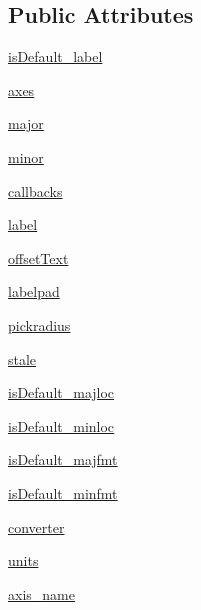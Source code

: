 \subsection*{Public Attributes}
\begin{DoxyCompactItemize}
\item 
\hyperlink{classmatplotlib_1_1axis_1_1Axis_a7c774d9fdb8d627010a5d7ff06da307b}{is\+Default\+\_\+label}
\item 
\hyperlink{classmatplotlib_1_1axis_1_1Axis_a55269c0e994e1786159877159b2a2a42}{axes}
\item 
\hyperlink{classmatplotlib_1_1axis_1_1Axis_a349fa77c014c5e44f472634075372df2}{major}
\item 
\hyperlink{classmatplotlib_1_1axis_1_1Axis_aee64f69c8c9efa6020be9cdefe5dbb49}{minor}
\item 
\hyperlink{classmatplotlib_1_1axis_1_1Axis_aa5e41db1ca96c52f36fca6e4393e3c77}{callbacks}
\item 
\hyperlink{classmatplotlib_1_1axis_1_1Axis_a2a176cae6b3bf1765db699f93604ac77}{label}
\item 
\hyperlink{classmatplotlib_1_1axis_1_1Axis_ae13c6fed1da8124b0367ddf6eca30635}{offset\+Text}
\item 
\hyperlink{classmatplotlib_1_1axis_1_1Axis_a07b62434c61bfbbba27c2b645040deae}{labelpad}
\item 
\hyperlink{classmatplotlib_1_1axis_1_1Axis_a25dc1b86cf6496a71d340ae4bb4f1c96}{pickradius}
\item 
\hyperlink{classmatplotlib_1_1axis_1_1Axis_a25818459cf429648f7c103f626a349b7}{stale}
\item 
\hyperlink{classmatplotlib_1_1axis_1_1Axis_a021eb80a1bc68ef912a46d3008b51948}{is\+Default\+\_\+majloc}
\item 
\hyperlink{classmatplotlib_1_1axis_1_1Axis_a57b0e251857809ed7ccc17d13b33dcd5}{is\+Default\+\_\+minloc}
\item 
\hyperlink{classmatplotlib_1_1axis_1_1Axis_a2f2025b06916eace69dacc5c5917b8ef}{is\+Default\+\_\+majfmt}
\item 
\hyperlink{classmatplotlib_1_1axis_1_1Axis_a847449d946c235bfa0b36b82e3c266e6}{is\+Default\+\_\+minfmt}
\item 
\hyperlink{classmatplotlib_1_1axis_1_1Axis_a0d64cd402213653bf8b066440f087742}{converter}
\item 
\hyperlink{classmatplotlib_1_1axis_1_1Axis_a8c868533f5e8f1f82485fb7635367013}{units}
\item 
\hyperlink{classmatplotlib_1_1axis_1_1Axis_a325dff3bfe7df8b90fa6923d67024fd7}{axis\+\_\+name}
\end{DoxyCompactItemize}
